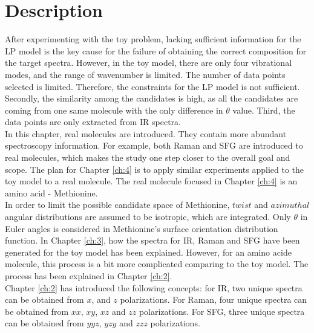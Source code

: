  \label{ch:4}
\section{Description}

After experimenting with the toy problem, lacking sufficient information for the LP model is the key cause for the failure of obtaining the correct composition for the target spectra. However, in the toy model, there are only four vibrational modes, and the range of wavenumber is limited. The number of data points selected is limited. Therefore, the constraints for the LP model is not sufficient. Secondly, the similarity among the candidates is high, as all the candidates are coming from one same molecule with the only difference in $\theta$ value. Third, the data points are only extracted from IR spectra. \\

In this chapter, real molecules are introduced. They contain more abundant spectroscopy information. For example, both Raman and SFG are introduced to real molecules, which makes the study one step closer to the overall goal and scope. The plan for Chapter \ref{ch:4} is to apply similar experiments applied to the toy model to a real molecule. The real molecule focused in Chapter \ref{ch:4} is an amino acid - Methionine. \\

In order to limit the possible candidate space of Methionine, $twist$ and $azimuthal$ angular distributions are assumed to be isotropic, which are integrated. Only $\theta$ in Euler angles is considered in Methionine's surface orientation distribution function. In Chapter \ref{ch:3}, how the spectra for IR, Raman and SFG have been generated for the toy model has been explained. However, for an amino acide molecule, this process is a bit more complicated comparing to the toy model. The process has been explained in Chapter \ref{ch:2}. \\


Chapter \ref{ch:2} has introduced the following concepts: for IR, two unique spectra can be obtained from $x$, and $z$ polarizations. For Raman, four unique spectra can be obtained from $xx$, $xy$, $xz$ and $zz$ polarizations. For SFG, three unique spectra can be obtained from $yyz$, $yzy$ and $zzz$ polarizations.\\

